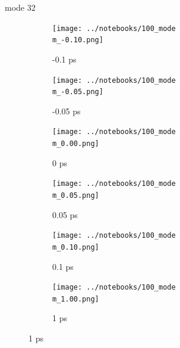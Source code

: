 \documentclass{beamer}
\begin{document}
\renewcommand\m{32}
\begin{frame}{mode \m}
	\begin{figure}
		\centering
		\begin{subfigure}[b]{\w\textwidth}
			\centering
			\texttt{[image: ../notebooks/100\_mode\\m\_-0.10.png]}
			\caption{-0.1 ps}
		\end{subfigure}
		\begin{subfigure}[b]{\w\textwidth}
			\centering
			\texttt{[image: ../notebooks/100\_mode\\m\_-0.05.png]}
			\caption{-0.05 ps}
		\end{subfigure}
		\begin{subfigure}[b]{\w\textwidth}
			\centering
			\texttt{[image: ../notebooks/100\_mode\\m\_0.00.png]}
			\caption{0 ps}
		\end{subfigure}
		\begin{subfigure}[b]{\w\textwidth}
			\centering
			\texttt{[image: ../notebooks/100\_mode\\m\_0.05.png]}
			\caption{0.05 ps}
		\end{subfigure}
		\begin{subfigure}[b]{\w\textwidth}
			\centering
			\texttt{[image: ../notebooks/100\_mode\\m\_0.10.png]}
			\caption{0.1 ps}
		\end{subfigure}
		\begin{subfigure}[b]{\w\textwidth}
			\centering
			\texttt{[image: ../notebooks/100\_mode\\m\_1.00.png]}
			\caption{1 ps}
		\end{subfigure}
	\end{figure}
\end{frame}
\end{document}

